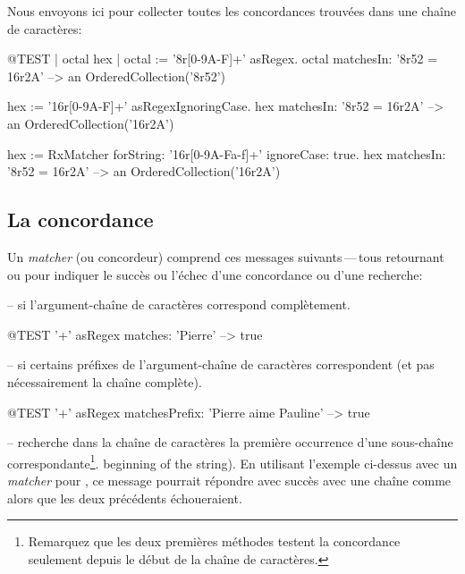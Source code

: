 \documentclass[a4paper,10pt,twoside]{book}
\begin{document}
Nous envoyons ici  pour collecter toutes
les concordances trouvées dans une chaîne de caractères:

\begin{code}{@TEST | octal hex |}
octal := '8r[0-9A-F]+' asRegex.
octal matchesIn: '8r52 = 16r2A' --> an OrderedCollection('8r52')

hex := '16r[0-9A-F]+' asRegexIgnoringCase.
hex matchesIn: '8r52 = 16r2A'   --> an OrderedCollection('16r2A')

hex := RxMatcher forString: '16r[0-9A-Fa-f]+' ignoreCase: true.
hex matchesIn: '8r52 = 16r2A'   --> an OrderedCollection('16r2A')
\end{code}

\subsection{La concordance}

Un \emph{matcher} (ou concordeur) comprend ces messages suivants\,---\,tous
retournant  ou  pour indiquer le succès ou l'échec
d'une concordance ou d'une recherche:

  --  si l'argument-chaîne de
caractères  correspond complètement.

\begin{code}{@TEST}
'\w+' asRegex matches: 'Pierre' --> true
\end{code}

  --  si certains préfixes
de l'argument-chaîne de caractères  correspondent (et pas
nécessairement la chaîne complète).

\begin{code}{@TEST}
'\w+' asRegex matchesPrefix: 'Pierre aime Pauline' --> true
\end{code}

  -- recherche dans la chaîne de
caractères la première occurrence d'une sous-chaîne
correspondante\footnote{Remarquez que les deux premières méthodes
  testent la concordance seulement depuis le début de la chaîne de caractères.}.
beginning of the string).
En utilisant l'exemple ci-dessus avec un \emph{matcher} pour ,
ce message pourrait répondre avec succès avec une chaîne comme
 alors que les deux précédents échoueraient. %
\end{document}
